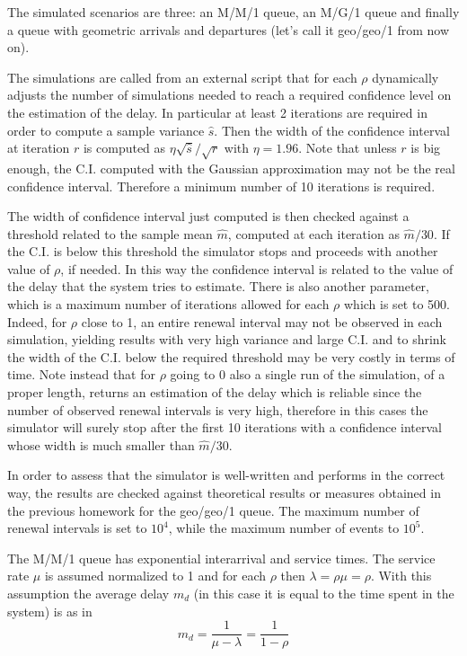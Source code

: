\documentclass[10pt]{article}
\begin{document}
The simulated scenarios are three: an M/M/1 queue, an M/G/1 queue and finally a queue with geometric arrivals and departures (let's call it geo/geo/1 from now on). 

The simulations are called from an external script that for each $\rho$ dynamically adjusts the number of simulations needed to reach a required confidence level on the estimation of the delay. In particular at least 2 iterations are required in order to compute a sample variance $\hat{s}$. Then the width of the confidence interval at iteration $r$ is computed as $\eta \sqrt{\hat{s}} / \sqrt{r}$ with $\eta = 1.96$. Note that unless $r$ is big enough, the C.I. computed with the Gaussian approximation may not be the real confidence interval. Therefore a minimum number of 10 iterations is required. 

The width of confidence interval just computed is then checked against a threshold related to the sample mean $\hat{m}$, computed at each iteration as $\hat{m}/30$. If the C.I. is below this threshold the simulator stops and proceeds with another value of $\rho$, if needed. In this way the confidence interval is related to the value of the delay that the system tries to estimate. There is also another parameter, which is a maximum number of iterations allowed for each $\rho$ which is set to 500. Indeed, for $\rho$ close to 1, an entire renewal interval may not be observed in each simulation, yielding results with very high variance and large C.I. and to shrink the width of the C.I. below the required threshold may be very costly in terms of time. Note instead that for $\rho$ going to 0 also a single run of the simulation, of a proper length, returns an estimation of the delay which is reliable since the number of observed renewal intervals is very high, therefore in this cases the simulator will surely stop after the first 10 iterations with a confidence interval whose width is much smaller than $\hat{m}/30$. 

In order to assess that the simulator is well-written and performs in the correct way, the results are checked against theoretical results or measures obtained in the previous homework for the geo/geo/1 queue. The maximum number of renewal intervals is set to $10^4$, while the maximum number of events to $10^5$.

The M/M/1 queue has exponential interarrival and service times. The service rate $\mu$ is assumed normalized to 1 and for each $\rho$ then $\lambda = \rho \mu = \rho$. With this assumption the average delay $m_d$ (in this case it is equal to the time spent in the system) is as in~\cite{bz}
\begin{equation}
	m_d = \frac{1}{\mu - \lambda} = \frac{1}{1-\rho}
\end{equation}
\end{document}
